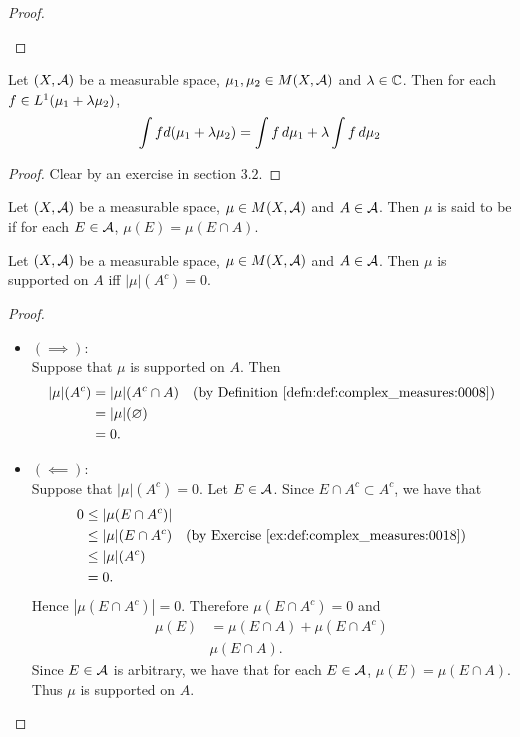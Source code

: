 \documentclass{book}
\begin{document}
\begin{proof}
\begin{enumerate}
		\end{enumerate}
	\end{proof}


	\begin{ex}  
	Let $(X, \mathcal{A})$ be a measurable space, $\mu_1, \mu_2 \in M(X, \mathcal{A})$ and $\lambda \in \mathbb{C}$. Then for each $f \in L^1(\mu_1 + \lambda \mu_2)$, 
	$$\int f d(\mu_1 + \lambda \mu_2) = \int f \, d \mu_1 + \lambda \int f \, d \mu_2$$
	\end{ex}
	
	\begin{proof}
	Clear by an exercise in section $3.2$.
	\end{proof}

	\begin{defn}  
		Let $(X, \mathcal{A})$ be a measurable space, $\mu \in M(X, \mathcal{A})$ and $A \in \mathcal{A}$. Then $\mu$ is said to be  if for each $E \in \mathcal{A}$, $\mu(E) = \mu(E \cap A)$. \\
	\end{defn}

	\begin{ex} 
		Let $(X, \mathcal{A})$ be a measurable space, $\mu \in M(X, \mathcal{A})$ and $A \in \mathcal{A}$. Then $\mu$ is supported on $A$ iff $|\mu|(A^c) = 0$.
	\end{ex}
	
	\begin{proof}\
		\begin{itemize}
			\item $(\implies)$: \\
			Suppose that $\mu$ is supported on $A$. Then 
			\begin{align*}
				|\mu|(A^c)
				& = |\mu|(A^c \cap A) \quad \text{(by \rd{def:complex_measures:0008})} \\
				& = |\mu|(\varnothing) \\
				& = 0. 			
			\end{align*}
			\item $(\impliedby)$: \\
			Suppose that $|\mu|(A^c) = 0$. Let $E \in \mathcal{A}$. Since $E \cap A^c \subset A^c$, we have that
			\begin{align*}
				0
				& \leq |\mu(E \cap A^c)| \\
				& \leq |\mu|(E \cap A^c) \quad \text{(by \rex{def:complex_measures:0018})} \\
				& \leq |\mu|(A^c) \\
				& = 0.
			\end{align*}
			Hence $|\mu(E \cap A^c)| = 0$. Therefore $\mu(E \cap A^c) = 0$ and 
			\begin{align*}
				\mu(E)
				& = \mu(E \cap A) + \mu(E \cap A^c) \\
				& \mu(E \cap A). 
			\end{align*}
			Since $E \in \mathcal{A}$ is arbitrary, we have that for each $E \in \mathcal{A}$, $\mu(E) = \mu(E \cap A)$. Thus $\mu$ is supported on $A$. 
		\end{itemize}
	\end{proof}
	
\end{document}
